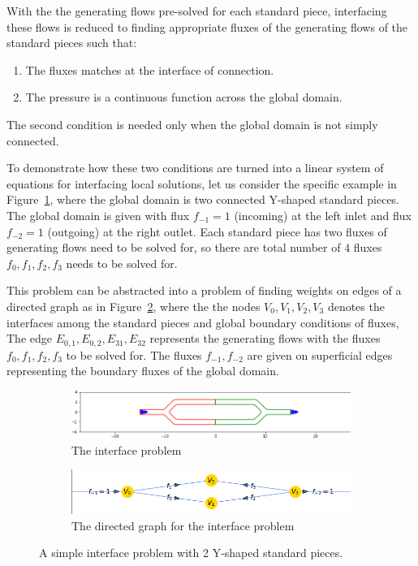 \documentclass[10pt,twocolumn,letterpaper]{article}
\begin{document}
With the the generating flows pre-solved for each standard piece, 
interfacing these flows is reduced to finding 
appropriate fluxes of the generating flows of the standard pieces such that:
\begin{enumerate}
  \item The fluxes matches at the interface of connection\label{cond:flux-match}.
  \item The pressure is a continuous function across the global  domain.\label{cond:pressure}
\end{enumerate}
The second condition is needed only when the global domain is not simply connected. 

To demonstrate how these two conditions are turned into 
a linear system of equations for interfacing local solutions, 
let us consider the specific example in Figure~\ref{fig:interface_problem_0}, where the global domain 
is two connected Y-shaped standard pieces. 
The global domain is given with flux $f_{-1} = 1$ (incoming) at the left inlet 
and flux $f_{-2}=1$ (outgoing) at the right outlet. 
Each standard piece has two fluxes of generating flows need to be solved for, 
so there are total number of $4$ fluxes $f_0,f_1,f_2,f_3$ needs to be solved for. 

This problem can be abstracted into a problem of finding weights on edges 
of a directed graph as in Figure~\ref{fig:interface_problem_1},
where the the nodes $V_0,V_1,V_2,V_3$ denotes the interfaces among the standard pieces 
and global boundary conditions of fluxes, 
The edge $E_{0,1},E_{0,2},E_{31},E_{32}$ represents the generating flows 
with the fluxes $f_0,f_1,f_2,f_3$ to be solved for. 
The fluxes $f_{-1},f_{-2}$ are given on superficial edges representing the boundary fluxes of the global domain.

\begin{figure}[!ht]
  \centering
  \begin{subfigure}[b]{0.45\textwidth}
    \centering
    \includegraphics[width=\textwidth]{pic/simple-interface-problem.png}
    \caption{The interface problem}\label{fig:interface_problem_0}
  \end{subfigure}
  \begin{subfigure}[b]{0.45\textwidth}
    \centering
    \includegraphics[width=\textwidth]{pic/simple-interface-problem-network.png}
    \caption{The directed graph for the interface problem}\label{fig:interface_problem_1}
  \end{subfigure}
  \caption{A simple interface problem with 2 Y-shaped standard pieces.}\label{fig:simple-interface-problem}
\end{figure}
\end{document}
